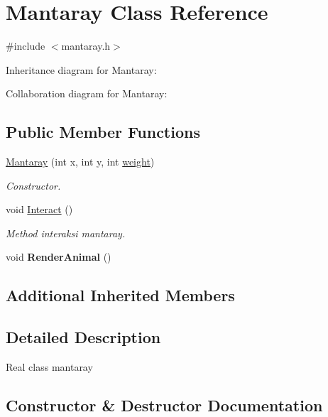 \hypertarget{classMantaray}{}\section{Mantaray Class Reference}
\label{classMantaray}


{\ttfamily \#include $<$mantaray.\+h$>$}



Inheritance diagram for Mantaray\+:


Collaboration diagram for Mantaray\+:
\subsection*{Public Member Functions}
\begin{DoxyCompactItemize}
\item 
\hyperlink{classMantaray_a8d6f7797387114165c362566ad5dbfbe}{Mantaray} (int x, int y, int \hyperlink{classAnimal_a9a3b22f243f7109c57f36b3c660feb6e}{weight})
\begin{DoxyCompactList}\small\item\em Constructor. \end{DoxyCompactList}\item 
void \hyperlink{classMantaray_a8d8abf16acb8d5fdd85af18e21a79fa4}{Interact} ()\hypertarget{classMantaray_a8d8abf16acb8d5fdd85af18e21a79fa4}{}\label{classMantaray_a8d8abf16acb8d5fdd85af18e21a79fa4}

\begin{DoxyCompactList}\small\item\em Method interaksi mantaray. \end{DoxyCompactList}\item 
void {\bfseries Render\+Animal} ()\hypertarget{classMantaray_a3907d25d81722644fec8c088f650c668}{}\label{classMantaray_a3907d25d81722644fec8c088f650c668}

\end{DoxyCompactItemize}
\subsection*{Additional Inherited Members}


\subsection{Detailed Description}
Real class mantaray 

\subsection{Constructor \& Destructor Documentation}
